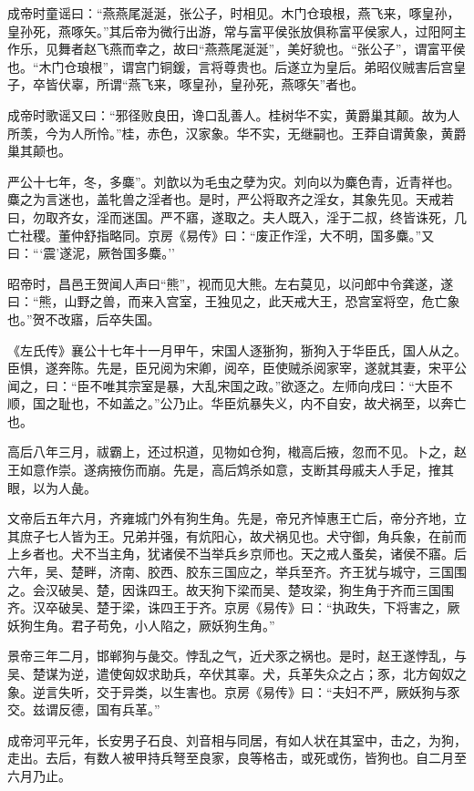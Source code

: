 \documentclass[]{article}
\begin{document}
成帝时童谣曰：``燕燕尾涎涎，张公子，时相见。木门仓琅根，燕飞来，啄皇孙，皇孙死，燕啄矢。''其后帝为微行出游，常与富平侯张放俱称富平侯家人，过阳阿主作乐，见舞者赵飞燕而幸之，故曰``燕燕尾涎涎''，美好貌也。``张公子''，谓富平侯也。``木门仓琅根''，谓宫门铜鍰，言将尊贵也。后遂立为皇后。弟昭仪贼害后宫皇子，卒皆伏辜，所谓``燕飞来，啄皇孙，皇孙死，燕啄矢''者也。

成帝时歌谣又曰：``邪径败良田，谗口乱善人。桂树华不实，黄爵巢其颠。故为人所羡，今为人所怜。''桂，赤色，汉家象。华不实，无继嗣也。王莽自谓黄象，黄爵巢其颠也。

严公十七年，冬，多麋''。刘歆以为毛虫之孽为灾。刘向以为麋色青，近青祥也。麋之为言迷也，盖牝兽之淫者也。是时，严公将取齐之淫女，其象先见。天戒若曰，勿取齐女，淫而迷国。严不寤，遂取之。夫人既入，淫于二叔，终皆诛死，几亡社稷。董仲舒指略同。京房《易传》曰：``废正作淫，大不明，国多麋。''又曰：```震'遂泥，厥咎国多麋。''

昭帝时，昌邑王贺闻人声曰``熊''，视而见大熊。左右莫见，以问郎中令龚遂，遂曰：``熊，山野之兽，而来入宫室，王独见之，此天戒大王，恐宫室将空，危亡象也。''贺不改寤，后卒失国。

《左氏传》襄公十七年十一月甲午，宋国人逐狾狗，狾狗入于华臣氏，国人从之。臣惧，遂奔陈。先是，臣兄阅为宋卿，阅卒，臣使贼杀阅家宰，遂就其妻，宋平公闻之，曰：``臣不唯其宗室是暴，大乱宋国之政。''欲逐之。左师向戌曰：``大臣不顺，国之耻也，不如盖之。''公乃止。华臣炕暴失义，内不自安，故犬祸至，以奔亡也。

高后八年三月，祓霸上，还过枳道，见物如仓狗，橶高后掖，忽而不见。卜之，赵王如意作崇。遂病掖伤而崩。先是，高后鸩杀如意，支断其母戚夫人手足，搉其眼，以为人彘。

文帝后五年六月，齐雍城门外有狗生角。先是，帝兄齐悼惠王亡后，帝分齐地，立其庶子七人皆为王。兄弟并强，有炕阳心，故犬祸见也。犬守御，角兵象，在前而上乡者也。犬不当主角，犹诸侯不当举兵乡京师也。天之戒人蚤矣，诸侯不寤。后六年，吴、楚畔，济南、胶西、胶东三国应之，举兵至齐。齐王犹与城守，三国围之。会汉破吴、楚，因诛四王。故天狗下梁而吴、楚攻梁，狗生角于齐而三国围齐。汉卒破吴、楚于梁，诛四王于齐。京房《易传》曰：``执政失，下将害之，厥妖狗生角。君子苟免，小人陷之，厥妖狗生角。''

景帝三年二月，邯郸狗与彘交。悖乱之气，近犬豕之祸也。是时，赵王遂悖乱，与吴、楚谋为逆，遣使匈奴求助兵，卒伏其辜。犬，兵革失众之占；豕，北方匈奴之象。逆言失听，交于异类，以生害也。京房《易传》曰：``夫妇不严，厥妖狗与豕交。兹谓反德，国有兵革。''

成帝河平元年，长安男子石良、刘音相与同居，有如人状在其室中，击之，为狗，走出。去后，有数人被甲持兵弩至良家，良等格击，或死或伤，皆狗也。自二月至六月乃止。
\end{document}
